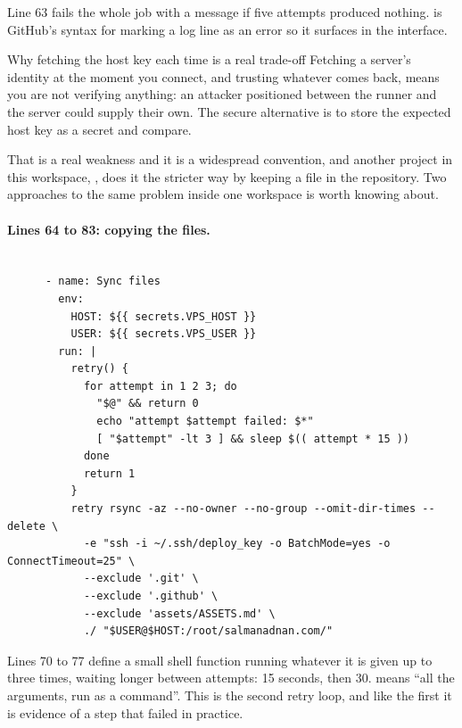 Line 63 fails the whole job with a message if five attempts produced nothing.
 is GitHub's syntax for marking a log line as an error so it surfaces
in the interface.

\begin{keyidea}{Why fetching the host key each time is a real trade-off}
Fetching a server's identity at the moment you connect, and trusting whatever comes
back, means you are not verifying anything: an attacker positioned between the
runner and the server could supply their own. The secure alternative is to store the
expected host key as a secret and compare.

That is a real weakness and it is a widespread convention, and another project in
this workspace, , does it the stricter way by keeping a
 file in the repository. Two approaches to the same
problem inside one workspace is worth knowing about.
\end{keyidea}

\paragraph{Lines 64 to 83: copying the files.}

\begin{lstlisting}[firstnumber=64,caption={\file{deploy.yml.disabled}, lines 64--83}]

      - name: Sync files
        env:
          HOST: ${{ secrets.VPS_HOST }}
          USER: ${{ secrets.VPS_USER }}
        run: |
          retry() {
            for attempt in 1 2 3; do
              "$@" && return 0
              echo "attempt $attempt failed: $*"
              [ "$attempt" -lt 3 ] && sleep $(( attempt * 15 ))
            done
            return 1
          }
          retry rsync -az --no-owner --no-group --omit-dir-times --delete \
            -e "ssh -i ~/.ssh/deploy_key -o BatchMode=yes -o ConnectTimeout=25" \
            --exclude '.git' \
            --exclude '.github' \
            --exclude 'assets/ASSETS.md' \
            ./ "$USER@$HOST:/root/salmanadnan.com/"
\end{lstlisting}

Lines 70 to 77 define a small shell function running whatever it is given up to
three times, waiting longer between attempts: 15 seconds, then 30. 
means ``all the arguments, run as a command''. This is the second retry loop, and
like the first it is evidence of a step that failed in practice.

